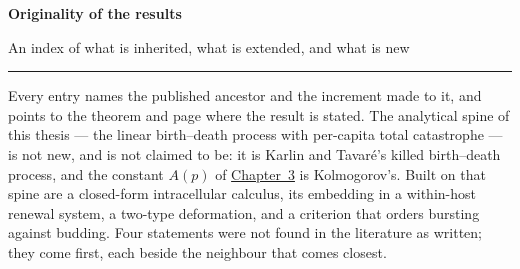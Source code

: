 
\providecommand{\yp}{\textit{Yersinia pestis}}
\providecommand{\ft}{\textit{Francisella tularensis}}

\makeatletter
{}
\makeatother

\providecommand{\Y}{}
\newcommand{\oihead}[1]{\textcolor{oisoft}{\footnotesize\bfseries\MakeUppercase{#1}}}
\newcommand{\anchor}[1]{\textcolor{oiaccent}{\textbf{#1}}}
\newcommand{\oisec}[1]{%
  \par\addvspace{0.7\baselineskip}%
  \noindent{\oihead{#1}}\par
  \nobreak\vspace{-0.15\baselineskip}%
  {\color{oirule}\rule{\linewidth}{0.5pt}}\par
  \nobreak\vspace{0.1\baselineskip}}

\clearpage
{}
{}

{\LARGE\bfseries Originality of the results\par}
\vspace{0.35\baselineskip}
{\color{oisoft}An index of what is inherited, what is extended, and what is new\par}
\vspace{0.3\baselineskip}
{\color{oirule}\rule{\linewidth}{0.8pt}}
\vspace{0.1\baselineskip}

\noindent
Every entry names the published ancestor and the increment made to it, and points to the
theorem and page where the result is stated. The analytical spine of this thesis --- the
linear birth--death process with per-capita total catastrophe --- is not new, and is not
claimed to be: it is Karlin and Tavar\'e's killed birth--death process, and the constant
$A(p)$ of \hyperref[gw:ch:galton-watson]{Chapter~3} is Kolmogorov's. Built on that spine
are a closed-form intracellular calculus, its embedding in a within-host renewal system,
a two-type deformation, and a criterion that orders bursting against budding. Four
statements were not found in the literature as written; they come first, each beside the
neighbour that comes closest.

